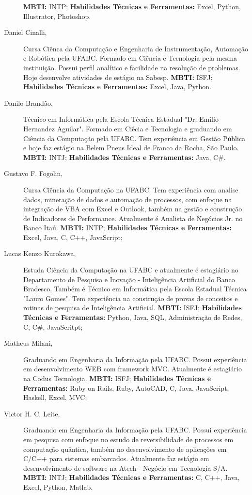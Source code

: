 \documentclass[12pt]{article}
\begin{document}
\begin{description}
\subitem \textbf{MBTI:} INTP;
\subitem \textbf{Habilidades Técnicas e Ferramentas:} Excel, Python, Illustrator, Photoshop.
\newline
\item[Daniel Cinalli,] \noindent Cursa Ciênca da Computação e Engenharia de Instrumentação, Automação e Robótica pela UFABC. Formado em Ciência e Tecnologia pela mesma instituição. Possui perfil analítico e facilidade na resolução de problemas. Hoje desenvolve atividades de estágio na Sabesp. 
\subitem \textbf{MBTI:} ISFJ;
\subitem \textbf{Habilidades Técnicas e Ferramentas:} Excel, Java, Python.
\newline
\item[Danilo Brandão,] \noindent Técnico em Informática pela Escola Técnica Estadual "Dr. Emílio Hernandez Aguilar". Formado em Ciêcia e Tecnologia e graduando em Ciência da Computação pela UFABC. Tem experiência em Gestão Pública e hoje faz estágio na Belem Pneus Ideal de Franco da Rocha, São Paulo.  
\subitem \textbf{MBTI:} INTJ;
\subitem \textbf{Habilidades Técnicas e Ferramentas:} Java, C\#.
\newline
\item[Gustavo F. Fogolin,] \noindent Cursa Ciência da Computação na UFABC. Tem experiência com analise dados, mineração de dados e automação de processos, com enfoque na integração de VBA com Excel e Outlook, também na gestão e construção de Indicadores de Performance. Atualmente é Analista de Negócios Jr. no Banco Itaú. 
\subitem \textbf{MBTI:} INTP;
\subitem \textbf{Habilidades Técnicas e Ferramentas:} Excel, Java, C, C++, JavaScript;
\newline
\item[Lucas Kenzo Kurokawa,] \noindent Estuda Ciência da Computação na UFABC e atualmente é estagiário no Departamento de Pesquisa e Inovação - Inteligência Artificial do Banco Bradesco. Também é Técnico em Informática pela Escola Estadual Técnica "Lauro Gomes". Tem experiência na construção de provas de conceitos e rotinas de pesquisa de Inteligência Artificial.  
\subitem \textbf{MBTI:} ISFJ;
\subitem \textbf{Habilidades Técnicas e Ferramentas:} Python, Java, SQL, Administração de Redes, C, C\#, JavaScritpt;
\\
\item[Matheus Milani,] \noindent Graduando em Engenharia da Informação pela UFABC. Possui experiência em desenvolvimento WEB   com framework MVC. Atualmente é estagiário na Codus Tecnologia. 
\subitem \textbf{MBTI:} ISFJ;
\subitem \textbf{Habilidades Técnicas e Ferramentas:} Ruby on Rails, Ruby, AutoCAD, C, Java, JavaScript, Haskell, Excel, MVC;
\\ 
\item[Victor H. C. Leite,] \noindent Graduando em Engenharia da Informação pela UFABC. Possui experiência em pesquisa com enfoque no estudo de reversibilidade de processos em computação quântica, também no desenvolvimento de aplicações em C/C++ para sistemas embarcados. Atualmente faz estágio em desenvolvimento de software na Atech - Negócio em Tecnologia S/A.
\subitem \textbf{MBTI:} INTJ;
\subitem \textbf{Habilidades Técnicas e Ferramentas:} C, C++, Java, Excel, Python, Matlab.
\end{description}
\end{document}
